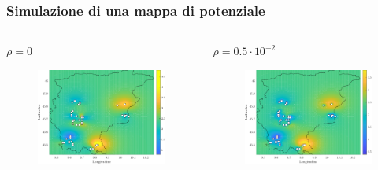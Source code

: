 \begin{frame}
	\frametitle{Simulazione di una mappa di potenziale}
	
	\begin{columns}[T]
		\begin{column}[t]{0.5\linewidth}
			\centering
			$\rho = 0$
			\begin{figure}
				\includegraphics[width=\textwidth]{../Tesi/Immagini/2. Nuovo modello/Mappa potenziale, rho = 0}
			\end{figure}
		\end{column}
		\begin{column}[t]{0.5\linewidth}
			\centering
			$\rho = 0.5\cdot 10^{-2}$
			\begin{figure}
				\includegraphics[width=\textwidth]{../Tesi/Immagini/2. Nuovo modello/Mappa potenziale, rho = 0.005}
			\end{figure}
		\end{column}
	\end{columns}

\end{frame}

